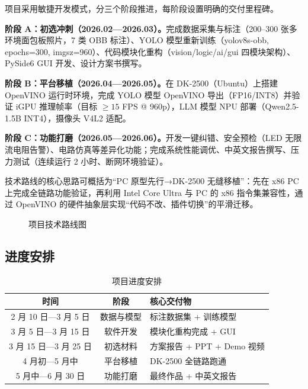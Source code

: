 \documentclass[a4paper,12pt,fontset=ubuntu]{ctexart}
\begin{document}
项目采用敏捷开发模式，分三个阶段推进，每阶段设置明确的交付里程碑。

\textbf{阶段 A：初选冲刺（2026.02—2026.03）。}完成数据采集与标注（200–300 张多环境面包板照片，7 类 OBB 标注）、YOLO 模型重新训练（yolov8s-obb, epochs=300, imgsz=960）、代码模块化重构（vision/logic/ai/gui 四模块架构）、PySide6 GUI 开发、设计方案书撰写。

\textbf{阶段 B：平台移植（2026.04—2026.05）。}在 DK-2500（Ubuntu）上搭建 OpenVINO 运行时环境，完成 YOLO 模型 OpenVINO 导出（FP16/INT8）并验证 iGPU 推理帧率（目标 $\ge 15$ FPS @ 960p），LLM 模型 NPU 部署（Qwen2.5-1.5B INT4），摄像头 V4L2 适配。

\textbf{阶段 C：功能打磨（2026.05—2026.06）。}开发一键纠错、安全预检（LED 无限流电阻告警）、电路仿真等差异化功能；完成系统性能调优、中英文报告撰写、压力测试（连续运行 2 小时、断网环境验证）。

技术路线的核心思路可概括为“PC 原型先行→DK-2500 无缝移植”：先在 x86 PC 上完成全链路功能验证，再利用 Intel Core Ultra 与 PC 的 x86 指令集兼容性，通过 OpenVINO 的硬件抽象层实现“代码不改、插件切换”的平滑迁移。

\begin{figure}[htbp]
    \centering
    \caption{项目技术路线图}
    \label{fig:roadmap}
\end{figure}

\subsection{进度安排}

\begin{table}[htbp]
    \centering
    \caption{项目进度安排}
    \label{tab:schedule}
    \begin{tabular}{c c l}
        \toprule
        \textbf{时间} & \textbf{阶段} & \textbf{核心交付物} \\
        \midrule
        2 月 10 日—3 月 5 日 & 数据与模型 & 标注数据集 + 训练模型 \\
        3 月 5 日—3 月 15 日 & 软件开发 & 模块化重构完成 + GUI \\
        3 月 15 日—3 月 25 日 & 初选材料 & 方案报告 + PPT + Demo 视频 \\
        4 月初—5 月中 & 平台移植 & DK-2500 全链路跑通 \\
        5 月中—6 月 30 日 & 功能打磨 & 最终作品 + 中英文报告 \\
        \bottomrule
    \end{tabular}
\end{table}
\end{document}
